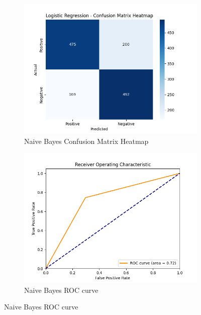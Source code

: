 \documentclass[conference]{IEEEtran}
\begin{document}
\begin{figure}[htbp]
    \begin{subfigure}{0.5\textwidth}
        \centering
        \includegraphics[width=\linewidth]{"../../images/logistic_regression/confusion_matrix_heatmap.png"}
        \caption{Naive Bayes Confusion Matrix Heatmap}
        \label{fig:naive_bayes_1}
    \end{subfigure}
    \begin{subfigure}{0.5\textwidth}
        \centering
        \includegraphics[width=\linewidth]{"../../images/logistic_regression/roc_curve.png"}
        \caption{Naive Bayes ROC curve}
        \label{fig:navie_bayes_2}
    \end{subfigure}

\end{figure}
\end{document}
